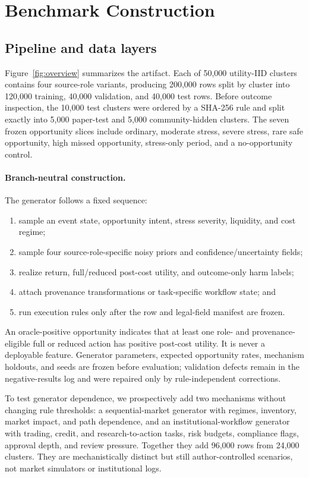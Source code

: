 \section{Benchmark Construction}

\subsection{Pipeline and data layers}
Figure~\ref{fig:overview} summarizes the artifact. Each of 50,000 utility-IID clusters contains four source-role variants, producing 200,000 rows split by cluster into 120,000 training, 40,000 validation, and 40,000 test rows. Before outcome inspection, the 10,000 test clusters were ordered by a SHA-256 rule and split exactly into 5,000 paper-test and 5,000 community-hidden clusters. The seven frozen opportunity slices include ordinary, moderate stress, severe stress, rare safe opportunity, high missed opportunity, stress-only period, and a no-opportunity control.

\paragraph{Branch-neutral construction.} The generator follows a fixed sequence:
\begin{enumerate}
  \item sample an event state, opportunity intent, stress severity, liquidity, and cost regime;
  \item sample four source-role-specific noisy priors and confidence/uncertainty fields;
  \item realize return, full/reduced post-cost utility, and outcome-only harm labels;
  \item attach provenance transformations or task-specific workflow state; and
  \item run execution rules only after the row and legal-field manifest are frozen.
\end{enumerate}
An oracle-positive opportunity indicates that at least one role- and provenance-eligible full or reduced action has positive post-cost utility. It is never a deployable feature. Generator parameters, expected opportunity rates, mechanism holdouts, and seeds are frozen before evaluation; validation defects remain in the negative-results log and were repaired only by rule-independent corrections.

To test generator dependence, we prospectively add two mechanisms without changing rule thresholds: a sequential-market generator with regimes, inventory, market impact, and path dependence, and an institutional-workflow generator with trading, credit, and research-to-action tasks, risk budgets, compliance flags, approval depth, and review pressure. Together they add 96,000 rows from 24,000 clusters. They are mechanistically distinct but still author-controlled scenarios, not market simulators or institutional logs.

